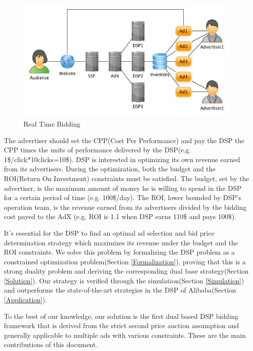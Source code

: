 \documentclass{article}
\begin{document}
\begin{figure}[!h]
\centering
\includegraphics[width=1.0\linewidth]{./DSP.jpg}
\caption{Real Time Bidding}
\end{figure}

The advertiser should set the CPP(Cost Per Performance) and
    pay the DSP the CPP times the units of performance delivered by the DSP(e.g. 1\$/click*10clicks=10\$).
DSP is interested in optimizing its own revenue earned from its advertisers.
During the optimization, both the budget and the ROI(Return On Investment) constraints must be satisfied.
The budget, set by the advertiser, is the maximum amount of money he is willing to spend in the DSP for a certain period of time (e.g. 100\$/day).
The ROI, lower bounded by DSP's operation team, is the revenue earned from its advertisers divided by the bidding cost payed to the AdX
    (e.g. ROI is 1.1 when DSP earns 110\$ and pays 100\$).

It's essential for the DSP to find an optimal ad selection and bid price determination strategy
    which maximizes its revenue under the budget and the ROI constraints.
We solve this problem by
    formalizing the DSP problem as a constrained optimization problem(Section \ref{Formalization}),
    proving that this is a strong duality problem and deriving the corresponding dual base strategy(Section \ref{Solution}).
Our strategy is verified through the simulation(Section \ref{Simulation}) and
    outperforms the state-of-the-art strategies in the DSP of Alibaba(Section \ref{Application}).

To the best of our knowledge, our solution is the first dual based DSP bidding framework
    that is derived from the strict second price auction assumption and
    generally applicable to multiple ads with various constraints.
These are the main contributions of this document.
\end{document}
